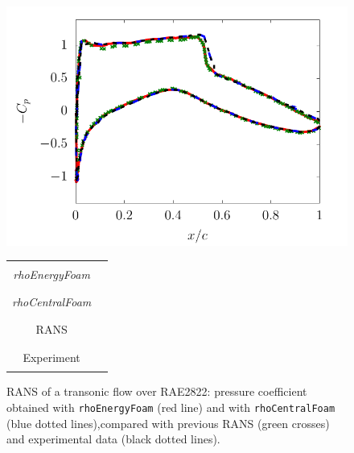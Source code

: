 \documentclass[a5paper]{sapthesis}
\begin{document}
	\begin{figure}[h]
		\centering
		\begin{minipage}{0.62\textwidth}
			\centering
			\includegraphics[width=1\textwidth, height=0.8\textwidth]{Figures/Cp_RAE2822}
		\end{minipage}
		\centering
		\begin{minipage}{0.8\textwidth}
			\centering
			\scriptsize
			\hspace{9mm}
			\begin{tabular}{cc}
				\toprule
				\textit{rhoEnergyFoam} &  \textcolor{red}{\rule{0.05\linewidth}{0.75mm}} \\
				\textit{rhoCentralFoam}  	   & 
				\textcolor{blue}{\rule{0.05\linewidth}{0.75mm}} \\
				RANS        &  \textcolor{green}{\rule{0.05\linewidth}{0.75mm}} \\
				Experiment        &  \textcolor{black}{\rule{0.05\linewidth}{0.75mm}} \\
				\bottomrule
			\end{tabular}
		\end{minipage}
			\caption[Pressure coefficient of RANS of a transonic flow over RAE2822]{RANS of a transonic flow over RAE2822: pressure coefficient obtained with \texttt{rhoEnergyFoam} (red line) and with \texttt{rhoCentralFoam} (blue dotted lines),compared with previous RANS (green crosses) and experimental data (black dotted lines).}
		\label{Cp_RAE2822}
	\end{figure}
	
				
	\newpage
\end{document}
